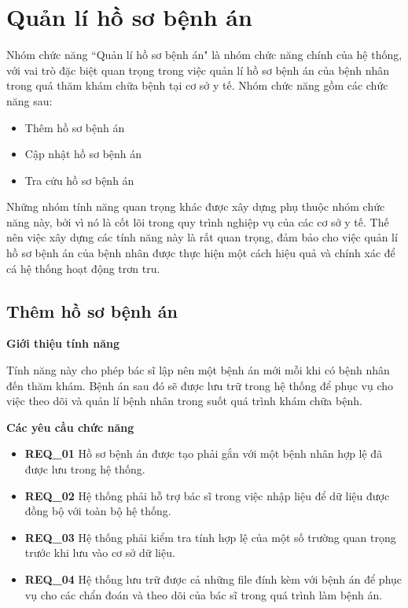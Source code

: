 \section{Quản lí hồ sơ bệnh án}

Nhóm chức năng ``Quản lí hồ sơ bệnh án" là nhóm chức năng chính của hệ thống, với vai trò đặc biệt quan trọng trong việc quản lí hồ sơ bệnh án của bệnh nhân trong quá thăm khám chữa bệnh tại cơ sở y tế. Nhóm chức năng gồm các chức năng sau:
\begin{itemize}
  \item Thêm hồ sơ bệnh án
  \item Cập nhật hồ sơ bệnh án
  \item Tra cứu hồ sơ bệnh án
\end{itemize}

Những nhóm tính năng quan trọng khác được xây dựng phụ thuộc nhóm chức năng này, bởi vì nó là cốt lõi trong quy trình nghiệp vụ của các cơ sở y tế. Thế nên việc xây dựng các tính năng này là rất quan trọng, đảm bảo cho việc quản lí hồ sơ bệnh án của bệnh nhân được thực hiện một cách hiệu quả và chính xác để cá hệ thống hoạt động trơn tru.

\subsection{Thêm hồ sơ bệnh án}

\noindent \textbf{Giới thiệu tính năng}

Tính năng này cho phép bác sĩ lập nên một bệnh án mới mỗi khi có bệnh nhân đến thăm khám. Bệnh án sau đó sẽ được lưu trữ trong hệ thống để phục vụ cho việc theo dõi và quản lí bệnh nhân trong suốt quá trình khám chữa bệnh.

\noindent \textbf{Các yêu cầu chức năng}
\begin{itemize}
  \item \textbf{REQ\_01} Hồ sơ bệnh án được tạo phải gắn với một bệnh nhân hợp lệ đã được lưu trong hệ thống.
  \item \textbf{REQ\_02} Hệ thống phải hỗ trợ bác sĩ trong việc nhập liệu để dữ liệu được đồng bộ với toàn bộ hệ thống.
  \item \textbf{REQ\_03} Hệ thống phải kiểm tra tính hợp lệ của một số trường quan trọng trước khi lưu vào cơ sở dữ liệu.
  \item \textbf{REQ\_04} Hệ thống lưu trữ được cả những file đính kèm với bệnh án để phục vụ cho các chẩn đoán và theo dõi của bác sĩ trong quá trình làm bệnh án.
\end{itemize}

